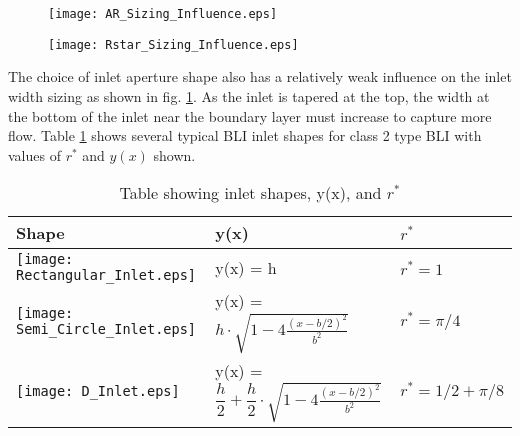 					\begin{figure}[htp]
						\centering
						\begin{minipage}{.45\textwidth}
							\centering
							\texttt{[image: AR\_Sizing\_Influence.eps]}
							\label{AR_Sizing_Influence}
						\end{minipage}%
						\hfill
						\begin{minipage}{.45\textwidth}
							\centering
							\texttt{[image: Rstar\_Sizing\_Influence.eps]}
							\label{Rstar_Sizing_Influence}
						\end{minipage}
					\end{figure}
					The choice of inlet aperture shape also has a relatively weak influence on the inlet width sizing as shown in fig. \ref{Rstar_Sizing_Influence}.  As the inlet is tapered at the top, the width at the bottom of the inlet near the boundary layer must increase to capture more flow.  Table \ref{Inlet_Table} shows several typical BLI inlet shapes for class 2 type BLI with values of $r^*$ and $y(x)$ shown.
					\begin{table}
						\centering
						\renewcommand{\arraystretch}{1.5}%
						\begin{tabular}	{|>{\centering\arraybackslash}m{4cm}  >{\centering\arraybackslash}m{} >{\centering\arraybackslash}m{}|} 					
							\hline
							Shape & y(x) & $r^*$\\ 
							\hline \hline
							\vspace{4mm}
							\texttt{[image: Rectangular\_Inlet.eps]}& y(x) = h & $r^* = 1$ \\		
							\vspace{4mm}
							\texttt{[image: Semi\_Circle\_Inlet.eps]}& y(x) = $h \cdot \sqrt{1 - 4\frac{\displaystyle(x-b/2)^2}{\displaystyle b^2}}$ & $r^* = \pi/4$ \\		
							\vspace{4mm}
							\texttt{[image: D\_Inlet.eps]}& y(x) = $\dfrac{h}{2} + \dfrac{h}{2} \cdot \sqrt{1 - 4\frac{\displaystyle(x-b/2)^2}{\displaystyle b^2}}$  & $r^* = 1/2 + \pi/8$ \\		
							\hline
						\end{tabular}
						\caption{Table showing inlet shapes, y(x), and $r^*$}
						\label{Inlet_Table}
					\end{table}
				
